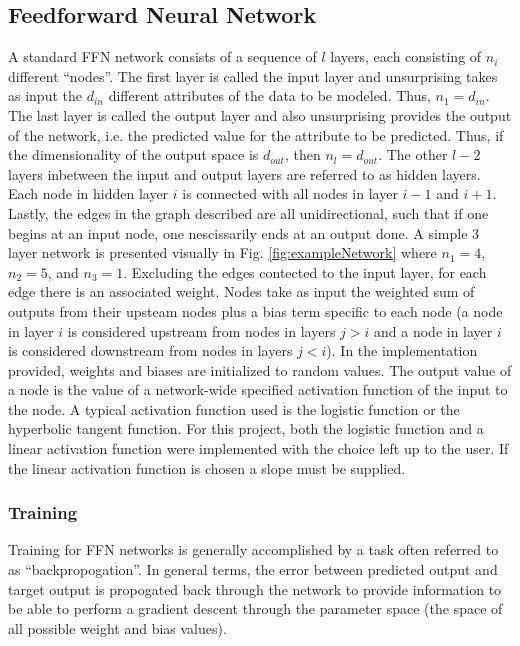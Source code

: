 \documentclass[conference]{IEEEtran}
\begin{document}
  \subsection{Feedforward Neural Network}
  A standard FFN network consists of a sequence of $l$ layers, each consisting of $n_i$ different ``nodes''. The first layer is called the input layer and unsurprising takes as input the $d_{in}$ different attributes of the data to be modeled. Thus, $n_1 = d_{in}$. The last layer is called the output layer and also unsurprising provides the output of the network, i.e. the predicted value for the attribute to be predicted. Thus, if the dimensionality of the output space is $d_{out}$, then $n_l = d_{out}$. The other $l-2$ layers inbetween the input and output layers are referred to as hidden layers. Each node in hidden layer $i$ is connected with all nodes in layer $i-1$ and $i+1$. Lastly, the edges in the graph described are all unidirectional, such that if one begins at an input node, one nescissarily ends at an output done. A simple 3 layer network is presented visually in Fig. \ref{fig:exampleNetwork} where $n_1 = 4$, $n_2 = 5$, and $n_3 = 1$.
  Excluding the edges contected to the input layer, for each edge there is an associated weight. Nodes take as input the weighted sum of outputs from their upsteam nodes plus a bias term specific to each node (a node in layer $i$ is considered upstream from nodes in layers $j>i$ and a node in layer $i$ is considered downstream from nodes in layers $j<i$). In the implementation provided, weights and biases are initialized to random values. The output value of a node is the value of a network-wide specified activation function of the input to the node. A typical activation function used is the logistic function or the hyperbolic tangent function. For this project, both the logistic function and a linear activation function were implemented with the choice left up to the user. If the linear activation function is chosen a slope must be supplied.

    \subsubsection{Training}
  Training for FFN networks is generally accomplished by a task often referred to as ``backpropogation''. In general terms, the error between predicted output and target output is propogated back through the network to provide information to be able to perform a gradient descent through the parameter space (the space of all possible weight and bias values).
  
\end{document}
